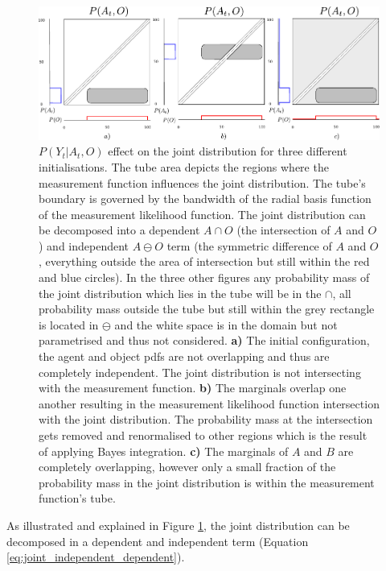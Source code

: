  \begin{figure}
 \centering
  \includegraphics[width=\textwidth]{./ch5-MLMF/Figures/Figure7.pdf}
  \caption{
 $P(Y_t|A_t,O)$ effect on the joint distribution for three different initialisations. 
  The tube area depicts the regions where the measurement function influences the joint distribution. 
  The tube's boundary is governed by the bandwidth of the radial basis function of the measurement likelihood function.
  The joint distribution can be decomposed into a dependent $A \cap O$ (the intersection of $A$ and $O$) and independent $A \ominus O$ term 
  (the symmetric difference of $A$ and $O$, everything outside the area of intersection but still within the red and blue circles). 
  In the three other figures any probability mass of the joint  distribution which lies in the tube will be in the $\cap$, all probability 
  mass outside the tube but still within the grey rectangle is located in $\ominus$ and 
 the white space is in the domain but not parametrised and thus not considered. \textbf{a)} The initial configuration, the agent and object pdfs 
 are not overlapping and thus are completely independent. The joint distribution is not intersecting with the measurement function.
 \textbf{b)} The marginals overlap one another resulting in the measurement likelihood function intersection with the joint distribution.
 The probability mass at the intersection gets removed and renormalised to other regions which is the result of applying Bayes integration. 
 \textbf{c)} The marginals of $A$ and $B$ are completely overlapping, however only a small fraction of the probability mass in the joint distribution 
 is within the measurement function's tube.}
  \label{fig:overlap_dependence_independence}
\end{figure}

As illustrated and explained in Figure \ref{fig:overlap_dependence_independence}, the joint distribution can be decomposed in a 
dependent and independent term (Equation \ref{eq:joint_independent_dependent}). 

